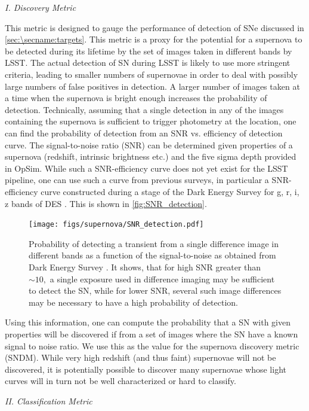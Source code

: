 \emph{I. Discovery Metric}

This metric is designed to gauge the performance of detection of SNe
discussed in \autoref{sec:\secname:targets}.
This metric is a proxy for the potential for a supernova to be detected
 during its lifetime by the set of images taken in different bands by LSST. The actual
 detection of SN during LSST is likely to use more stringent criteria, leading to 
 smaller numbers of supernovae in order to deal with possibly large numbers of false positives in detection. A larger
 number of images taken at a time when the supernova is bright enough increases the
 probability of detection. Technically, assuming that a single detection in any of the images containing
 the supernova is sufficient to trigger photometry at the location, one can find the
 probability of detection from an SNR vs. efficiency of detection curve. The signal-to-noise ratio
(SNR) can be determined given properties of a supernova (redshift, intrinsic brightness etc.)
 and the five sigma depth provided in OpSim. While such a SNR-efficiency curve does not
 yet exist for the LSST pipeline, one can use such a curve from previous surveys, in particular a
 SNR-efficiency curve constructed during a stage of the Dark Energy Survey for g, r, i, z bands of DES
 \citep{Kessler2015}. This is shown in \autoref{fig:SNR_detection}.
\begin{figure}
 \centering
 \texttt{[image: figs/supernova/SNR\_detection.pdf]}
 \caption{Probability of detecting a transient from a single difference image in different bands as
a
 function of the signal-to-noise as obtained from Dark Energy Survey \citep{Kessler2015}. It shows,
that
for high SNR greater than $\sim 10,$ a single exposure used in difference imaging may be sufficient to detect the SN, while for
lower SNR, several such image differences may be necessary to have a high probability of
detection.}
 \label{fig:SNR_detection}
\end{figure}

Using this information, one can compute the probability that a SN with given properties
will be discovered if from a set of images where the SN have a known signal to noise ratio. We use this as the
value for the supernova discovery metric (SNDM). While very high redshift (and thus faint)
supernovae will not be discovered, it is
potentially possible to discover many supernovae whose light curves will in turn not be well
characterized or hard to classify.


\emph{II. Classification Metric}

